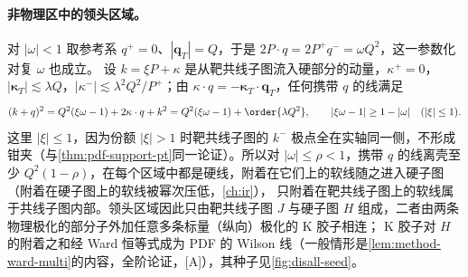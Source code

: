 \paragraph{非物理区中的领头区域。}
对 $|\omega|<1$ 取参考系 $q^+=0$、$|\mathbf q_T|=Q$，于是 $2P\cdot q=2P^+q^-=\omega Q^2$，这一参数化对复 $\omega$ 也成立。
设 $k=\xi P+\kappa$ 是从靶共线子图流入硬部分的动量，$\kappa^+=0$，$|\boldsymbol\kappa_T|\lesssim\lambda Q$，$|\kappa^-|\lesssim\lambda^2Q^2/P^+$；由 $\kappa\cdot q=-\boldsymbol\kappa_T\cdot\mathbf q_T$，任何携带 $q$ 的线满足
\begin{equation}\label{eq:disall-unphysical-offshell}
(k+q)^2=Q^2(\xi\omega-1)+2\kappa\cdot q+k^2=Q^2(\xi\omega-1)+\order{\lambda Q^2},\qquad |\xi\omega-1|\ge1-|\omega|\quad(|\xi|\le1).
\end{equation}
这里 $|\xi|\le1$，因为份额 $|\xi|>1$ 时靶共线子图的 $k^-$ 极点全在实轴同一侧，不形成钳夹（与\cref{thm:pdf-support-pt}同一论证）。所以对 $|\omega|\le\rho<1$，携带 $q$ 的线离壳至少 $Q^2(1-\rho)$，在每个区域中都是硬线，附着在它们上的软线随之进入硬子图（附着在硬子图上的软线被幂次压低，\cref{ch:ir}），
只附着在靶共线子图上的软线属于共线子图内部。领头区域因此只由靶共线子图 $J$ 与硬子图 $H$ 组成，二者由两条物理极化的部分子外加任意多条标量（纵向）极化的 K 胶子相连；
K 胶子对 $H$ 的附着之和经 Ward 恒等式成为 PDF 的 Wilson 线（一般情形是\cref{lem:method-ward-multi}的内容，全阶论证，[A]），其种子见\cref{fig:disall-seed}。

